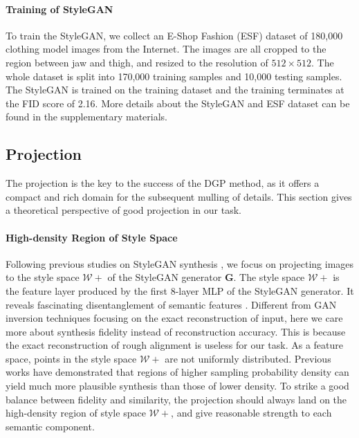 \documentclass[10pt,twocolumn,letterpaper]{article}
\begin{document}
\paragraph{Training of StyleGAN} To train the StyleGAN, we collect an E-Shop Fashion (ESF) dataset of 180,000 clothing model images from the Internet. The images are all cropped to the region between jaw and thigh, and resized to the resolution of $512\times512$. The whole dataset is split into 170,000 training samples and 10,000 testing samples. The StyleGAN is trained on the training dataset and the training terminates at the FID score of 2.16. More details about the StyleGAN and ESF dataset can be found in the supplementary materials.

\subsection{Projection}\label{sec:projection}
The projection is the key to the success of the DGP method, as it offers a compact and rich domain for the subsequent mulling of details. This section gives a theoretical perspective of good projection in our task.

\paragraph{High-density Region of Style Space} Following previous studies on StyleGAN synthesis \cite{shen2020interpreting,tewari2020stylerig,abdal2019image2stylegan}, we focus on projecting images to the style space $\mathcal{W}+$ of the StyleGAN generator $\bm{G}$. The style space $\mathcal{W}+$ is the feature layer produced by the first 8-layer MLP of the StyleGAN generator. It reveals fascinating disentanglement of semantic features \cite{shen2020interpreting,karras2020analyzing}. Different from GAN inversion \cite{richardson2021encoding,abdal2019image2stylegan,abdal2020image2stylegan++, tov2021designing} techniques focusing on the exact reconstruction of input, here we care more about synthesis fidelity instead of reconstruction accuracy. This is because the exact reconstruction of rough alignment is useless for our task. As a feature space, points in the style space $\mathcal{W}+$ are not uniformly distributed. Previous works \cite{shen2020interpreting,abdal2019image2stylegan,karras2020analyzing} have demonstrated that regions of higher sampling probability density can yield much more plausible synthesis than those of lower density. To strike a good balance between fidelity and similarity, the projection should always land on the high-density region of style space $\mathcal{W}+$, and give reasonable strength to each semantic component. 
\end{document}
